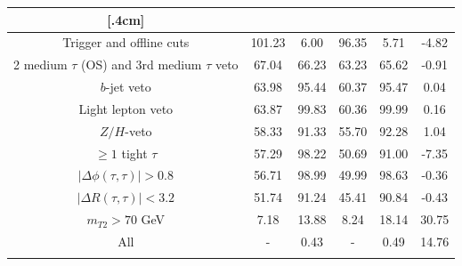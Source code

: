 \documentclass{ws-mpla}
\begin{document}
\begin{table}[t]
{\begin{tabular}{@{}c c c c c c@{}}
[.4cm]
%
\multicolumn{5}{c}{ \textbf{SR-high Mass} }\\\hline
Trigger and offline cuts                        &   101.23 &  6.00 &    96.35 &  5.71 &  -4.82 \\
2 medium $\tau$ (OS) and 3rd medium $\tau$ veto &    67.04 & 66.23 &    63.23 & 65.62 &  -0.91 \\
$b$-jet veto                                    &    63.98 & 95.44 &    60.37 & 95.47 &   0.04 \\
Light lepton veto                               &    63.87 & 99.83 &    60.36 & 99.99 &   0.16 \\
$Z/H$-veto                                      &    58.33 & 91.33 &    55.70 & 92.28 &   1.04 \\
$ \geq 1 $ tight $\tau$                         &    57.29 & 98.22 &    50.69 & 91.00 &  -7.35 \\
$ |\Delta\phi(\tau,\tau)| > 0.8 $               &    56.71 & 98.99 &    49.99 & 98.63 &  -0.36 \\
$ |\Delta R(\tau,\tau)| < 3.2 $                 &    51.74 & 91.24 &    45.41 & 90.84 &  -0.43 \\
$ m_{T2} > 70 $ GeV                             &     7.18 & 13.88 &     8.24 & 18.14 &  30.75 \\
\hline
All                                             &        - &  0.43 &        - &  0.49 &  14.76 \\
[.2cm] \botrule
\end{tabular}
\label{tab:120GeV} }
\end{table}
\end{document}
